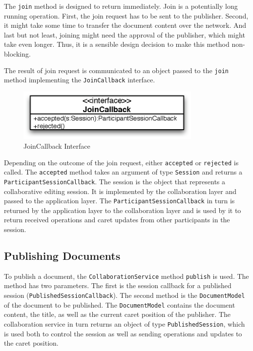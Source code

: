 The \texttt{join} method is designed to return immediately. Join is a 
potentially long running operation. First, the join request has to be sent
to the publisher. Second, it might take some time to transfer the document
content over the network. And last but not least, joining might need the 
approval of the publisher, which might take even longer. Thus, it is a sensible 
design decision to make this method non-blocking.

The result of join request is communicated to an object passed to the
\texttt{join} method implementing the \texttt{JoinCallback} interface.

\begin{figure}[H]
 \centering
 \includegraphics[width=9.07cm,height=2.58cm]{../images/finalreport/architecture_joincallback_uml.eps}
 \caption{JoinCallback Interface}
\end{figure}

Depending on the outcome of the join request, either \texttt{accepted} or
\texttt{rejected} is called. The \texttt{accepted} method takes an argument
of type \texttt{Session} and returns a \texttt{ParticipantSessionCallback}. 
The session
is the object that represents a collaborative editing session. It is
implemented by the collaboration layer and passed to the application layer.
The \texttt{ParticipantSessionCallback} in turn is returned by the application 
layer to the collaboration layer and is used by it to return received operations
and caret updates from other participants in the session.


\subsection{Publishing Documents}
To publish a document, the \texttt{CollaborationService} method \texttt{publish}
is used. The method has two parameters. The first is the session callback
for a published session (\texttt{PublishedSessionCallback}). The second method 
is the \texttt{DocumentModel}
of the document to be published. The \texttt{DocumentModel} contains the
document content, the title, as well as the current caret position of the
publisher. The collaboration service in turn returns an object of type
\texttt{PublishedSession}, which is used both to control the session as well
as sending operations and updates to the caret position.


